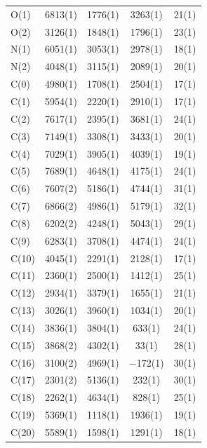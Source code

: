 \twocolumn
\begin{center}
\tablelasttail{\bottomrule}
 {\footnotesize \singlespacing
\begin{supertabular}{lcccc}
O(1)&6813(1)&1776(1)&3263(1)&21(1)\\
O(2)&3126(1)&1848(1)&1796(1)&23(1)\\
N(1)&6051(1)&3053(1)&2978(1)&18(1)\\
N(2)&4048(1)&3115(1)&2089(1)&20(1)\\
C(0)&4980(1)&1708(1)&2504(1)&17(1)\\
C(1)&5954(1)&2220(1)&2910(1)&17(1)\\
C(2)&7617(1)&2395(1)&3681(1)&24(1)\\
C(3)&7149(1)&3308(1)&3433(1)&20(1)\\
C(4)&7029(1)&3905(1)&4039(1)&19(1)\\
C(5)&7689(1)&4648(1)&4175(1)&24(1)\\
C(6)&7607(2)&5186(1)&4744(1)&31(1)\\
C(7)&6866(2)&4986(1)&5179(1)&32(1)\\
C(8)&6202(2)&4248(1)&5043(1)&29(1)\\
C(9)&6283(1)&3708(1)&4474(1)&24(1)\\
C(10)&4045(1)&2291(1)&2128(1)&17(1)\\
C(11)&2360(1)&2500(1)&1412(1)&25(1)\\
C(12)&2934(1)&3379(1)&1655(1)&21(1)\\
C(13)&3026(1)&3960(1)&1034(1)&20(1)\\
C(14)&3836(1)&3804(1)&633(1)&24(1)\\
C(15)&3868(2)&4302(1)&33(1)&28(1)\\
C(16)&3100(2)&4969(1)&$-$172(1)&30(1)\\
C(17)&2301(2)&5136(1)&232(1)&30(1)\\
C(18)&2262(1)&4634(1)&828(1)&25(1)\\
C(19)&5369(1)&1118(1)&1936(1)&19(1)\\
C(20)&5589(1)&1598(1)&1291(1)&18(1)\\

\end{supertabular}}
\end{center}
